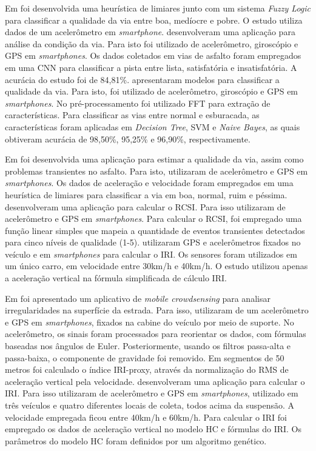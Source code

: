 Em \cite{Badurowicz2020} foi desenvolvida uma heurística de limiares junto com um sistema \textit{Fuzzy Logic} para classificar a qualidade da via entre boa, medíocre e pobre. O estudo utiliza dados de um acelerômetro em \textit{smartphone}. \cite{Leizerovych2020} desenvolveram uma aplicação para análise da condição da via. Para isto foi utilizado de acelerômetro, giroscópio e GPS em \textit{smartphones}. Os dados coletados em vias de asfalto foram empregados em uma CNN para classificar a pista entre lista, satisfatória e insatisfatória. A acurácia do estudo foi de 84,81\%. \cite{Allouch2017} apresentaram modelos para classificar a qualidade da via. Para isto, foi utilizado de acelerômetro, giroscópio e GPS em \textit{smartphones}. No pré-processamento foi utilizado FFT para extração de características. Para classificar as vias entre normal e esburacada, as características foram aplicadas em \textit{Decision Tree}, SVM e \textit{Naive Bayes}, as quais obtiveram acurácia de 98,50\%, 95,25\% e 96,90\%, respectivamente.

Em \cite{Lima2016}  foi desenvolvida uma aplicação para estimar a qualidade da via, assim como problemas transientes no asfalto. Para isto, utilizaram de acelerômetro e GPS em \textit{smartphones}. Os dados de aceleração e velocidade foram empregados em uma heurística de limiares para classificar a via em boa, normal, ruim e péssima.
\cite{Brunauer2016} desenvolveram uma aplicação para calcular o RCSI. Para isso utilizaram de acelerômetro e GPS em \textit{smartphones}. Para calcular o RCSI, foi empregado uma função linear simples que mapeia a quantidade de eventos transientes detectados para cinco níveis de qualidade (1-5). \cite{AbdelRaheem2020} utilizaram GPS e acelerômetros fixados no veículo e em \textit{smartphones} para calcular o IRI. Os sensores foram utilizados em um único carro, em velocidade entre 30km/h e 40km/h. O estudo utilizou apenas a aceleração vertical na fórmula simplificada de cálculo IRI. 

Em \cite{Li2018} foi apresentado um aplicativo de \textit{mobile crowdsensing} para analisar irregularidades na superfície da estrada. Para isso, utilizaram de um acelerômetro e GPS em \textit{smartphones}, fixados na cabine do veículo por meio de suporte. No acelerômetro, os sinais foram processados para reorientar os dados, com fórmulas baseadas nos ângulos de Euler. Posteriormente, usando os filtros passa-alta e passa-baixa, o componente de gravidade foi removido. Em segmentos de 50 metros foi calculado o índice IRI-proxy, através da normalização do RMS de aceleração vertical pela velocidade. \cite{Zhao2016} desenvolveram uma aplicação para calcular o IRI. Para isso utilizaram de acelerômetro e GPS em \textit{smartphones}, utilizado em três veículos e quatro diferentes locais de coleta, todos acima da suspensão. A velocidade empregada ficou entre 40km/h e 60km/h. Para calcular o IRI foi empregado os dados de aceleração vertical no modelo HC e fórmulas do IRI. Os parâmetros do modelo HC foram definidos por um algoritmo genético.

